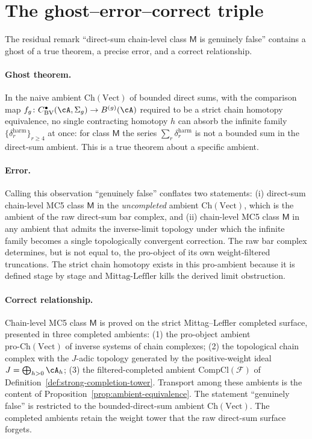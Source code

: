 \section{The ghost--error--correct triple}
\label{sec:mc5-ghost-triple}

The residual remark ``direct-sum chain-level class $\mathsf{M}$ is
genuinely false'' contains a ghost of a true theorem, a precise error,
and a correct relationship.

\paragraph{Ghost theorem.} In the naive ambient $\mathrm{Ch}(\mathrm{Vect})$
of bounded direct sums, with the comparison map
$f_g \colon C^{\bullet}_{\mathrm{BV}}(\cA, \Sigma_g) \to B^{(g)}(\cA)$
required to be a strict chain homotopy equivalence, no single contracting
homotopy $h$ can absorb the infinite family $\{\delta_r^{\mathrm{harm}}\}_{r \geq 4}$
at once: for class $\mathsf{M}$ the series $\sum_r \delta_r^{\mathrm{harm}}$
is not a bounded sum in the direct-sum ambient. This is a true theorem
about a specific ambient.

\paragraph{Error.} Calling this observation ``genuinely false'' conflates
two statements: \textup{(i)} direct-sum chain-level MC5 class $\mathsf{M}$
in the \emph{uncompleted} ambient $\mathrm{Ch}(\mathrm{Vect})$, which is
the ambient of the raw direct-sum bar complex, and \textup{(ii)} chain-level
MC5 class $\mathsf{M}$ in any ambient that admits the inverse-limit
topology under which the infinite family becomes a single topologically
convergent correction. The raw bar complex determines, but is not equal
to, the pro-object of its own weight-filtered truncations. The strict
chain homotopy exists in this pro-ambient because it is defined stage
by stage and $\mathrm{Mittag\text{-}Leffler}$ kills the derived limit
obstruction.

\paragraph{Correct relationship.} Chain-level MC5 class $\mathsf{M}$ is
proved on the strict Mittag--Leffler completed surface, presented in
three completed ambients:
\textup{(1)} the pro-object ambient $\mathrm{pro}\text{-}\mathrm{Ch}(\mathrm{Vect})$
of inverse systems of chain complexes; \textup{(2)} the topological
chain complex with the $J$-adic topology generated by the positive-weight
ideal $J = \bigoplus_{h > 0} \cA_h$; \textup{(3)} the filtered-completed
ambient $\mathrm{CompCl}(\mathcal{F})$ of
Definition~\textup{\ref{def:strong-completion-tower}}. Transport among
these ambients is the content of
Proposition~\ref{prop:ambient-equivalence}. The statement
``genuinely false'' is restricted to the bounded-direct-sum ambient
$\mathrm{Ch}(\mathrm{Vect})$. The completed ambients retain the
weight tower that the raw direct-sum surface forgets.

